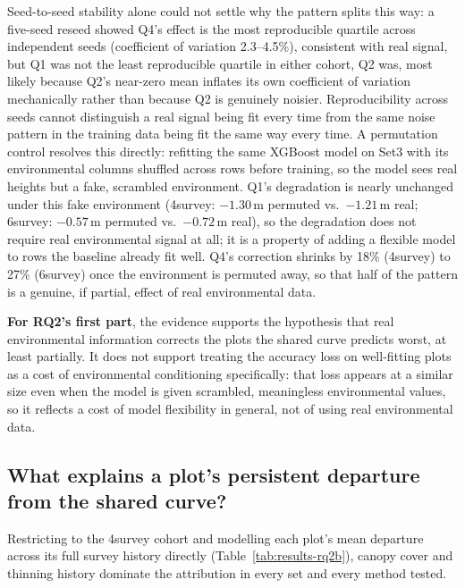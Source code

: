 \documentclass[11pt,a4paper]{report}
\begin{document}
Seed-to-seed stability alone could not settle why the pattern splits this way: a
five-seed reseed showed Q4's effect is the most reproducible quartile across
independent seeds (coefficient of variation 2.3--4.5\%), consistent with real signal,
but Q1 was not the least reproducible quartile in either cohort, Q2 was, most likely
because Q2's near-zero mean inflates its own coefficient of variation mechanically
rather than because Q2 is genuinely noisier. Reproducibility across seeds cannot
distinguish a real signal being fit every time from the same noise pattern in the
training data being fit the same way every time. A permutation control resolves this
directly: refitting the same XGBoost model on Set3 with its environmental columns
shuffled across rows before training, so the model sees real heights but a fake,
scrambled environment. Q1's degradation is nearly unchanged under this fake
environment (4survey: $-1.30$\,m permuted vs.\ $-1.21$\,m real; 6survey: $-0.57$\,m
permuted vs.\ $-0.72$\,m real), so the degradation does not require real
environmental signal at all; it is a property of adding a flexible model to rows the
baseline already fit well. Q4's correction shrinks by 18\% (4survey) to 27\%
(6survey) once the environment is permuted away, so that half of the pattern is a
genuine, if partial, effect of real environmental data.

\textbf{For RQ2's first part}, the evidence supports the hypothesis that real
environmental information corrects the plots the shared curve predicts worst, at
least partially. It does not support treating the accuracy loss on well-fitting plots
as a cost of environmental conditioning specifically: that loss appears at a similar
size even when the model is given scrambled, meaningless environmental values, so it
reflects a cost of model flexibility in general, not of using real environmental
data.

\subsection{What explains a plot's persistent departure from the shared curve?}
\label{sec:results-rq2b}

Restricting to the 4survey cohort and modelling each plot's mean departure across its
full survey history directly (Table~\ref{tab:results-rq2b}), canopy cover and thinning
history dominate the attribution in every set and every method tested.
\end{document}

